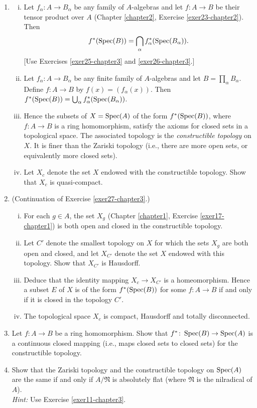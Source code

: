 \begin{enumerate}
    \item \label{exer27-chapter3} \begin{enumerate}[i)]
        \item Let $f_\alpha \colon A \to B_\alpha$ be any family of $A$-algebras and let $f \colon A \to B$ be their tensor product over $A$ (Chapter \ref{chapter2}, Exercise \ref{exer23-chapter2}). Then \[f^*(\operatorname{Spec}(B)) = \bigcap_\alpha f_\alpha^*(\operatorname{Spec}(B_\alpha)).\] [Use Exercises \ref{exer25-chapter3} and \ref{exer26-chapter3}.]
        \item Let $f_\alpha \colon A \to B_\alpha$ be any finite family of $A$-algebras and let $B = \prod_\alpha B_\alpha$. Define $f \colon A \to B$ by $f(x) = (f_\alpha(x))$. Then $f^*(\operatorname{Spec}(B)) = \bigcup_\alpha f_\alpha^*(\operatorname{Spec}(B_\alpha))$.
        \item Hence the subsets of $X = \operatorname{Spec}(A)$ of the form $f^*(\operatorname{Spec}(B))$, where $f \colon A \to B$ is a ring homomorphism, satisfy the axioms for closed sets in a topological space. The associated topology is the \emph{constructible topology} on $X$. It is finer than the Zariski topology (i.e., there are more open sets, or equivalently more closed sets).
        \item Let $X_c$ denote the set $X$ endowed with the constructible topology. Show that $X_c$ is quasi-compact.
    \end{enumerate}

    \item \label{exer28-chapter3} (Continuation of Exercise \ref{exer27-chapter3}.)
    \begin{enumerate}[i)]
        \item For each $g \in A$, the set $X_g$ (Chapter \ref{chapter1}, Exercise \ref{exer17-chapter1}) is both open and closed in the constructible topology.
        \item Let $C'$ denote the smallest topology on $X$ for which the sets $X_g$ are both open and closed, and let $X_{C'}$ denote the set $X$ endowed with this topology. Show that $X_{C'}$ is Hausdorff.
        \item Deduce that the identity mapping $X_c \to X_{C'}$ is a homeomorphism. Hence a subset $E$ of $X$ is of the form $f^*(\operatorname{Spec}(B))$ for some $f \colon A \to B$ if and only if it is closed in the topology $C'$.
        \item The topological space $X_c$ is compact, Hausdorff and totally disconnected.
    \end{enumerate}

    \item Let $f \colon A \to B$ be a ring homomorphism. Show that $f^* \colon \operatorname{Spec}(B) \to \operatorname{Spec}(A)$ is a continuous closed mapping (i.e., maps closed sets to closed sets) for the constructible topology.

    \item Show that the Zariski topology and the constructible topology on $\operatorname{Spec}(A)$ are the same if and only if $A/\mathfrak{N}$ is absolutely flat (where $\mathfrak{N}$ is the nilradical of $A$).\\
    \textit{Hint:} Use Exercise \ref{exer11-chapter3}.
\end{enumerate}
